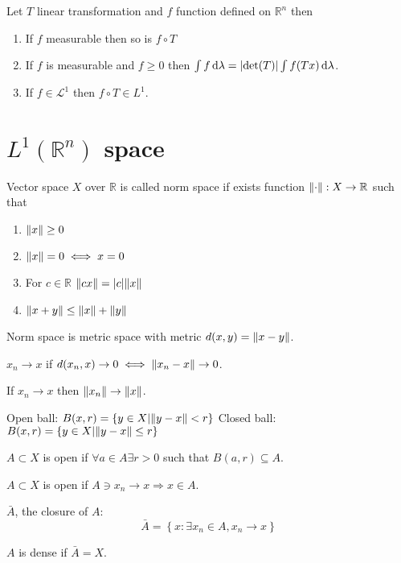 	\begin{theorem}
		Let $T$ linear transformation and $f$ function defined on $\mathbb{R}^n$ then
		\begin{enumerate}
			\item If $f$ measurable then so is $f\circ T$
			\item If $f$ is measurable and $f\geq 0$ then $\int f \dd{\lambda} = \abs{\det(T)} \int f(Tx)\dd{\lambda}$.
			\item If $f\in \mathcal{L}^1$ then $f\circ T \in L^1$.
		\end{enumerate}
	\end{theorem}
	
	\section{$L^1(\mathbb{R}^n )$ space}
	\begin{definition}
		Vector space $X$ over $\mathbb{R}$ is called norm space if exists function $\norm{\cdot} : X\to \mathbb{R}$ such that
		\begin{enumerate}
			\item $\norm{x} \geq 0$
			\item $\norm{x} = 0 \iff x=0$
			\item For $c\in \mathbb{R}$ $\norm{cx} = \abs{c} \norm{x}$
			\item $\norm{x+y} \leq \norm{x} + \norm{y}$
		\end{enumerate}
	\end{definition}
	Norm space is metric space with metric $d(x,y) = \norm{x-y}$.
	
	\begin{definition}[Convergence]
		$x_n\to x$ if $d(x_n, x) \to 0 \iff \norm{x_n-x}\to 0$.
		
		If $x_n\to x$ then $\norm{x_n} \to \norm{x}$.
	\end{definition}
	\begin{definition}
		Open ball: $B(x,r) = \left\{ y\in X | \norm{y-x} < r \right\}$
		Closed ball: $B(x,r) = \left\{ y\in X | \norm{y-x} \leq r \right\}$
	\end{definition}
	\begin{definition}
		$A\subset X$ is open if $\forall a\in A \exists r>0$ such that $B(a,r) \subseteq A$.
	\end{definition}
	\begin{definition}
		$A\subset X$ is open if $A \ni x_n \to x \Rightarrow x\in A$.
	\end{definition}
	\begin{definition}[Closure]
		$\bar{A} $, the closure of $A$:
		$$\bar{A} = \left\{ x: \exists x_n \in A , x_n \to x \right\}$$
	\end{definition}
	\begin{definition}
		$A$ is dense if $\bar{A} = X$.
	\end{definition}
	
